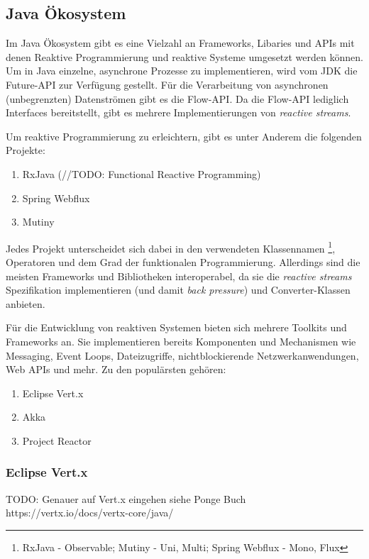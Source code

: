 \subsection{Java Ökosystem}
\label{section:java_tooling}
Im Java Ökosystem gibt es eine Vielzahl an Frameworks, Libaries und APIs mit denen Reaktive Programmierung und reaktive Systeme umgesetzt
werden können.
Um in Java einzelne, asynchrone Prozesse zu implementieren, wird vom JDK die Future-API zur Verfügung gestellt.\parencite{OracleFuture}
Für die Verarbeitung von asynchronen (unbegrenzten) Datenströmen gibt es die Flow-API.\parencite{OracleFlow}
Da die Flow-API lediglich Interfaces bereitstellt, gibt es mehrere Implementierungen von \textit{reactive streams}.

Um reaktive Programmierung zu erleichtern, gibt es unter Anderem die folgenden Projekte:
\begin{enumerate}
	\item RxJava (//TODO: Functional Reactive Programming)
	\item Spring Webflux
	\item Mutiny
\end{enumerate}
Jedes Projekt unterscheidet sich dabei in den verwendeten Klassennamen \footnote{RxJava - Observable; Mutiny - Uni, Multi; Spring Webflux - Mono, Flux},
Operatoren und dem Grad der funktionalen Programmierung.\parencite{ReactiveX, Mutiny}
Allerdings sind die meisten Frameworks und Bibliotheken interoperabel, da sie die \textit{reactive streams} Spezifikation implementieren (und damit
\textit{back pressure}) und Converter-Klassen anbieten.

Für die Entwicklung von reaktiven Systemen bieten sich mehrere Toolkits und Frameworks an.
Sie implementieren bereits Komponenten und Mechanismen wie Messaging, Event Loops, Dateizugriffe, nichtblockierende Netzwerkanwendungen, Web APIs und mehr.
Zu den populärsten gehören:
\begin{enumerate}
	\item Eclipse Vert.x
	\item Akka
	\item Project Reactor
\end{enumerate}\parencite{Vert.x, Akka, ProjectReactor}

\subsubsection{Eclipse Vert.x}
\label{section:Vert.x}
TODO: Genauer auf Vert.x eingehen siehe Ponge Buch
https://vertx.io/docs/vertx-core/java/
